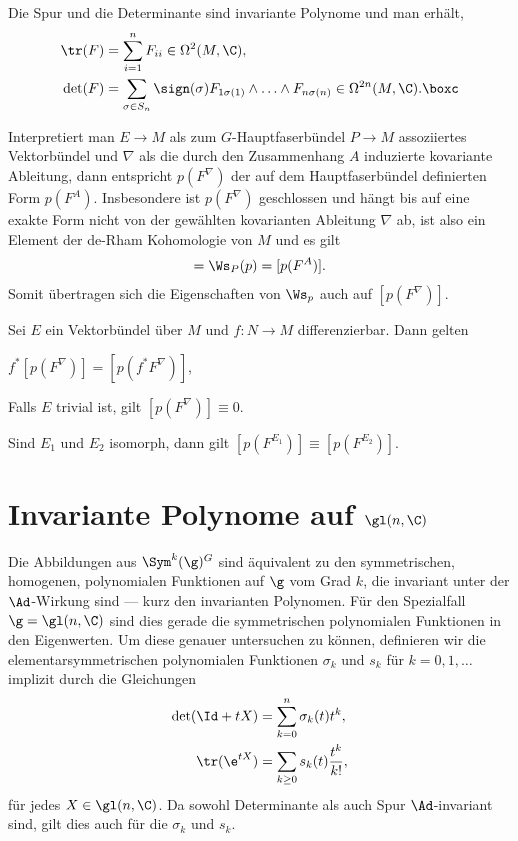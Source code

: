 \documentclass[%
	paper=a5,%
	fleqn,%
	DIV=18,%
	BCOR=0mm,
	fontsize=11pt,
	titlepage=false,%
	bibliography=totoc,
	DIV=18,%
	twoside=true,
	pdftitle=Riemannsche Geometrie,
	pdfauthor=Uwe Semmelmann,
	numbers=noendperiod]%
	{scrbook}
\begin{document}
\begin{ex}
Die Spur und die Determinante sind invariante Polynome und man erhält,
\begin{align*}
\tr(F) &= \sum_{i=1}^n F_{ii} \in \Omega^2(M,\C),\\
\det(F) &= \sum_{\sigma\in S_n} \sign(\sigma) F_{1\sigma(1)}\wedge \ldots
\wedge F_{n\sigma(n)} \in \Omega^{2n}(M,\C).\boxc
\end{align*} 
\end{ex}


Interpretiert man $E\to M$ als zum
$G$-Hauptfaserbündel $P\to M$  assoziiertes Vektorbündel und $\nabla$ als die
durch den Zusammenhang $A$ induzierte kovariante Ableitung, dann entspricht  $p(F^\nabla)$ der auf dem Hauptfaserbündel definierten
Form $p(F^A)$. Insbesondere ist $p(F^\nabla)$ geschlossen und hängt bis auf
eine exakte Form nicht von der gewählten kovarianten Ableitung $\nabla$ ab, ist also ein Element
der de-Rham Kohomologie von $M$ und es gilt
\begin{align*}
[p(F^\nabla)] = \Ws_P(p) = [p(F^A)].
\end{align*}
Somit übertragen sich die Eigenschaften von $\Ws_p$ auch auf $[p(F^\nabla)]$.

\begin{lem}
Sei $E$ ein Vektorbündel über $M$ und $f: N\to M$ differenzierbar. Dann gelten
\begin{propenum}
\item $f^*[p(F^\nabla)] = [p(f^*F^\nabla)]$,
\item Falls $E$ trivial ist, gilt $[p(F^\nabla)]\equiv 0$.
\item Sind $E_1$ und $E_2$ isomorph, dann gilt $[p(F^{E_1})] \equiv
[p(F^{E_2})]$.\fish
\end{propenum}
\end{lem}

\section{Invariante Polynome auf $\gl(n,\C)$}

Die Abbildungen aus $\Sym^k(\g)^G$ sind äquivalent zu den symmetrischen,
homogenen, polynomialen Funktionen auf $\g$ vom Grad $k$, die invariant unter
der $\Ad$-Wirkung sind --- kurz den invarianten Polynomen. Für den Spezialfall
$\g=\gl(n,\C)$ sind dies gerade die symmetrischen polynomialen
Funktionen in den Eigenwerten. Um diese genauer untersuchen zu können,
definieren wir die elementarsymmetrischen polynomialen Funktionen $\sigma_k$
und $s_k$ für $k=0,1,\ldots$ implizit durch die Gleichungen
\begin{align*}
\det(\Id + tX) &= \sum_{k=0}^n \sigma_k(t) t^k,\\
\tr(\e^{tX}) &= \sum_{k\ge 0} s_k(t)\frac{t^k}{k!},
\end{align*}
für jedes $X\in \gl(n,\C)$. Da sowohl Determinante als auch Spur $\Ad$-invariant
sind, gilt dies auch für die $\sigma_k$ und $s_k$.
\end{document}
